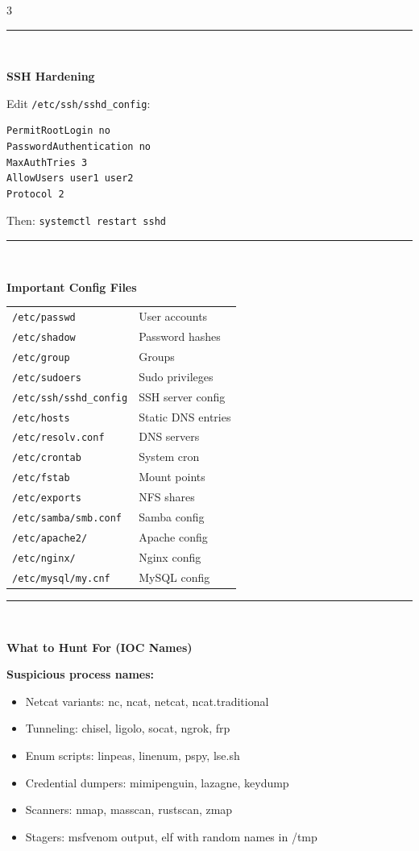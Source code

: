 \documentclass[10pt,landscape]{article}
\newcommand{\colorsec}[2]{%
  \vspace{1.5ex plus 0.5ex minus 0.5ex}%
  \noindent\rule{\linewidth}{0.4pt}\\[-0.7ex]%
  \noindent\colorbox{#1}{\parbox{\dimexpr\linewidth-2\fboxsep}{%
    \strut\textbf{\normalsize\color{sblue} #2}}}%
  \vspace{0.5ex}\par\nobreak%
}
\begin{document}
\begin{multicols}{3}
\colorsec{secgray}{SSH Hardening}
Edit \verb!/etc/ssh/sshd_config!:
\begin{lstlisting}
PermitRootLogin no
PasswordAuthentication no
MaxAuthTries 3
AllowUsers user1 user2
Protocol 2
\end{lstlisting}
Then: \verb!systemctl restart sshd!

\colorsec{secgray}{Important Config Files}
\begin{tabular}{@{}ll@{}}
\verb!/etc/passwd!          & User accounts \\
\verb!/etc/shadow!          & Password hashes \\
\verb!/etc/group!           & Groups \\
\verb!/etc/sudoers!         & Sudo privileges \\
\verb!/etc/ssh/sshd_config! & SSH server config \\
\verb!/etc/hosts!           & Static DNS entries \\
\verb!/etc/resolv.conf!     & DNS servers \\
\verb!/etc/crontab!         & System cron \\
\verb!/etc/fstab!           & Mount points \\
\verb!/etc/exports!         & NFS shares \\
\verb!/etc/samba/smb.conf!  & Samba config \\
\verb!/etc/apache2/!        & Apache config \\
\verb!/etc/nginx/!          & Nginx config \\
\verb!/etc/mysql/my.cnf!    & MySQL config \\
\end{tabular}

\colorsec{secgreen}{What to Hunt For (IOC Names)}
\textbf{Suspicious process names:}
\begin{itemize} \itemsep0pt \parskip0pt  
\item Netcat variants: nc, ncat, netcat, ncat.traditional
\item Tunneling: chisel, ligolo, socat, ngrok, frp
\item Enum scripts: linpeas, linenum, pspy, lse.sh
\item Credential dumpers: mimipenguin, lazagne, keydump
\item Scanners: nmap, masscan, rustscan, zmap
\item Stagers: msfvenom output, elf with random names in /tmp
\end{itemize}


\end{multicols}
\end{document}
